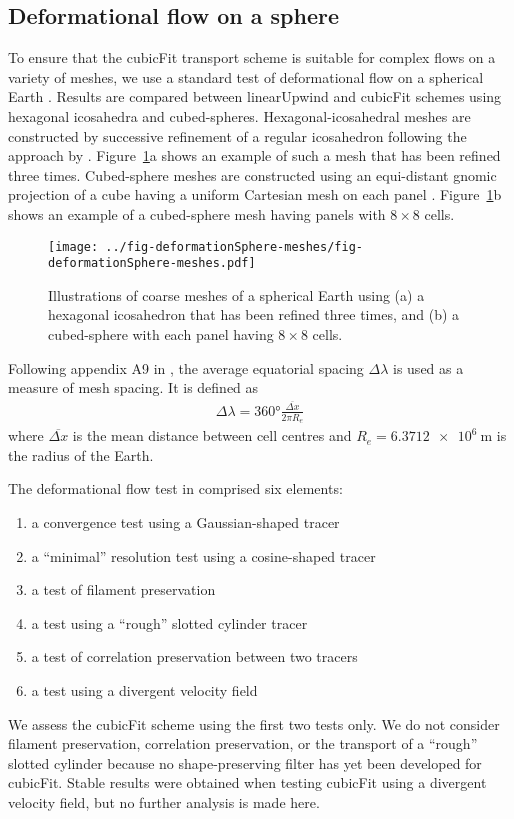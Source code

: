 \subsection{Deformational flow on a sphere}
\label{sec:deformationSphere}

To ensure that the cubicFit transport scheme is suitable for complex flows on a variety of meshes, we use a standard test of deformational flow on a spherical Earth \citep{lauritzen2012}.  
Results are compared between linearUpwind and cubicFit schemes using hexagonal icosahedra and cubed-spheres.
Hexagonal-icosahedral meshes are constructed by successive refinement of a regular icosahedron following the approach by \citep{thuburn2014}.
Figure~\ref{fig:sphere-meshes}a shows an example of such a mesh that has been refined three times.
Cubed-sphere meshes are constructed using an equi-distant gnomic projection of a cube having a uniform Cartesian mesh on each panel \citep{staniforth-thuburn2012}.
Figure~\ref{fig:sphere-meshes}b shows an example of a cubed-sphere mesh having panels with $8 \times 8$ cells.

\begin{figure}
	\centering
	\texttt{[image: ../fig-deformationSphere-meshes/fig-deformationSphere-meshes.pdf]}
	\caption{Illustrations of coarse meshes of a spherical Earth using (a) a hexagonal icosahedron that has been refined three times, and (b) a cubed-sphere with each panel having $8 \times 8$ cells.}
	\label{fig:sphere-meshes}
\end{figure}

Following appendix A9 in \citep{lauritzen2014}, the average equatorial spacing $\Delta \lambda$ is used as a measure of mesh spacing.  It is defined as
\begin{align}
	\Delta \lambda = \ang{360} \frac{\overline{\Delta x}}{2 \pi R_e}
\end{align}
where $\overline{\Delta x}$ is the mean distance between cell centres and $R_e = \SI{6.3712e6}{\meter}$ is the radius of the Earth.

The deformational flow test in \citep{lauritzen2012} comprised six elements:
\begin{enumerate}
\item a convergence test using a Gaussian-shaped tracer
\item a ``minimal'' resolution test using a cosine-shaped tracer
\item a test of filament preservation
\item a test using a ``rough'' slotted cylinder tracer
\item a test of correlation preservation between two tracers
\item a test using a divergent velocity field
\end{enumerate}
We assess the cubicFit scheme using the first two tests only.  We do not consider filament preservation, correlation preservation, or the transport of a ``rough'' slotted cylinder because no shape-preserving filter has yet been developed for cubicFit.  Stable results were obtained when testing cubicFit using a divergent velocity field, but no further analysis is made here.  

